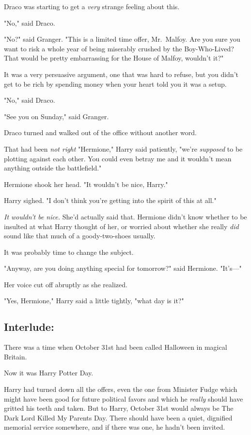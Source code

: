 Draco was starting to get a \emph{very} strange feeling about this.

"No," said Draco.

"No?" said Granger. "This is a limited time offer, Mr.~Malfoy. Are you sure you
want to risk a whole year of being miserably crushed by the Boy-Who-Lived? That
would be pretty embarrassing for the House of Malfoy, wouldn't it?"

It was a very persuasive argument, one that was hard to refuse, but you didn't
get to be rich by spending money when your heart told you it was a setup.

"No," said Draco.

"See you on Sunday," said Granger.

Draco turned and walked out of the office without another word.

That had been \emph{not right{\el}}
\sbreak
"Hermione," Harry said patiently, "we're \emph{supposed} to be plotting against
each other. You could even betray me and it wouldn't mean anything outside the
battlefield."

Hermione shook her head. "It wouldn't be nice, Harry."

Harry sighed. "I don't think you're getting into the spirit of this at all."

\emph{It wouldn't be nice.} She'd actually said that. Hermione didn't know
whether to be insulted at what Harry thought of her, or worried about whether
she really \emph{did} sound like that much of a goody-two-shoes usually.

It was probably time to change the subject.

"Anyway, are you doing anything special for tomorrow?" said Hermione. "It's—"

Her voice cut off abruptly as she realized.

"Yes, Hermione," Harry said a little tightly, "what day is it?"
\sbreak
\vspace{-2\baselineskip}
\subsection{Interlude:}

There was a time when October 31st had been called Halloween in magical Britain.

Now it was Harry Potter Day.

Harry had turned down all the offers, even the one from Minister Fudge which
might have been good for future political favors and which he \emph{really}
should have gritted his teeth and taken. But to Harry, October 31st would
always be The Dark Lord Killed My Parents Day. There should have been a quiet,
dignified memorial service somewhere, and if there was one, he hadn't been
invited.

